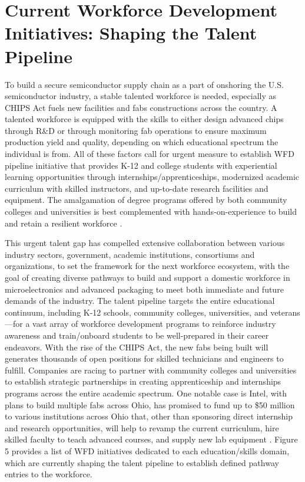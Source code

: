 \section{Current Workforce Development Initiatives: Shaping the Talent Pipeline}\label{sec4:workforce}
To build a secure semiconductor supply chain as a part of onshoring the U.S. semiconductor industry, a stable talented workforce is needed, especially as CHIPS Act fuels new facilities and fabs constructions across the country. A talented workforce is equipped with the skills to either design advanced chips through R\&D or through monitoring fab operations to ensure maximum production yield and quality, depending on which educational spectrum the individual is from. All of these factors call for urgent measure to establish WFD pipeline initiative that provides K-12 and college students with experiential learning opportunities through internships/apprenticeships, modernized academic curriculum with skilled instructors, and up-to-date research facilities and equipment. The amalgamation of degree programs offered by both community colleges and universities is best complemented with hands-on-experience to build and retain a resilient workforce \cite{fueling_american}.

This urgent talent gap has compelled extensive collaboration between various industry sectors, government, academic institutions, consortiums and organizations, to set the framework for the next workforce ecosystem, with the goal of creating diverse pathways to build and support a domestic workforce in microelectronics and advanced packaging to meet both immediate and future demands of the industry. The talent pipeline targets the entire educational continuum, including K-12 schools, community colleges, universities, and veterans—for a vast array of workforce development programs to reinforce industry awareness and train/onboard students to be well-prepared in their career endeavors. With the rise of the CHIPS Act, the new fabs being built will generates thousands of open positions for skilled technicians and engineers to fulfill. Companies are racing to partner with community colleges and universities to establish strategic partnerships in creating apprenticeship and internships programs across the entire academic spectrum. One notable case is Intel, with plans to build multiple fabs across Ohio, has promised to fund up to \$50 million to various institutions across Ohio that, other than sponsoring direct internship and research opportunities, will help to revamp the current curriculum, hire skilled faculty to teach advanced courses, and supply new lab equipment \cite{Patel2023_ref14}. Figure 5 provides a list of WFD initiatives dedicated to each education/skills domain, which are currently shaping the talent pipeline to establish defined pathway entries to the workforce.


